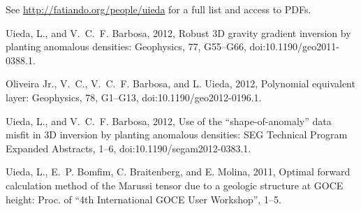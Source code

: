 \documentclass[11pt,a4paper,helvetica]{moderncv}
\begin{document}
%
%

\begin{thebibliography}{}

 {\small See
\url{http://fatiando.org/people/uieda} for a full list and access to PDFs.}

Uieda, L., and V.~C.~F. Barbosa,  2012, {Robust 3D gravity gradient inversion
  by planting anomalous densities}: Geophysics, 77, G55--G66,
  doi:10.1190/geo2011-0388.1.

{Oliveira Jr.}, V.~C., V.~C.~F. Barbosa, and L. Uieda,  2012, {Polynomial
  equivalent layer}: Geophysics, 78, G1--G13, doi:10.1190/geo2012-0196.1.

Uieda, L., and V.~C.~F. Barbosa, 2012, {Use of the ``shape-of-anomaly'' data
  misfit in 3D inversion by
  planting anomalous densities}: SEG Technical Program Expanded Abstracts,
  1--6, doi:10.1190/segam2012-0383.1.

Uieda, L., E.~P. Bomfim, C. Braitenberg, and E. Molina,  2011, {Optimal forward
  calculation method of the Marussi tensor due to a geologic structure at GOCE
  height}: Proc. of ``4th International GOCE User Workshop'', 1--5.

\end{thebibliography}
\end{document}
